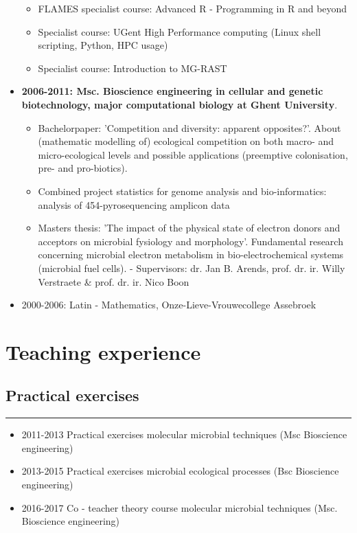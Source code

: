 \documentclass[a4paper,11pt,oneside]{article}
\begin{document}
\begin{itemize}
\begin{itemize}
      \item FLAMES specialist course: Advanced R - Programming in R and beyond
      \item Specialist course: UGent High Performance computing (Linux shell scripting, Python, HPC usage)
      \item Specialist course: Introduction to MG-RAST
    \end{itemize}
\item \textbf{2006-2011: Msc. Bioscience engineering in cellular and genetic biotechnology, major computational biology at Ghent University}. 
	\begin{itemize}
		\item Bachelorpaper: 'Competition and diversity: apparent opposites?'. About (mathematic modelling of) ecological competition on both macro- and micro-ecological levels and possible applications (preemptive colonisation, pre- and pro-biotics).
		\item Combined project statistics for genome analysis and bio-informatics: analysis of 454-pyrosequencing amplicon data
		\item Masters thesis: 'The impact of the physical state of electron donors and acceptors on microbial fysiology and morphology'. Fundamental research concerning microbial electron metabolism in bio-electrochemical systems (microbial fuel cells). - Supervisors: dr. Jan B. Arends, prof. dr. ir. Willy Verstraete \& prof. dr. ir. Nico Boon
	\end{itemize}
\item 2000-2006: Latin - Mathematics, Onze-Lieve-Vrouwecollege Assebroek
\end{itemize}



\section*{Teaching experience}
\subsection*{Practical exercises}
\rule{\textwidth}{1pt}
\begin{itemize}
  \item 2011-2013 Practical exercises molecular microbial techniques (Msc Bioscience engineering)
  \item 2013-2015 Practical exercises microbial ecological processes (Bsc Bioscience engineering)
  \item 2016-2017 Co - teacher theory course molecular microbial techniques (Msc. Bioscience engineering) 
\end{itemize}
\end{document}
